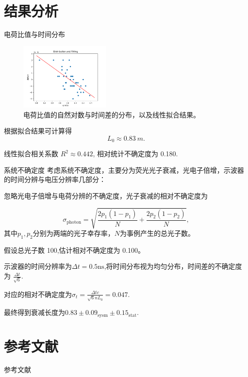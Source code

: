 \documentclass[10pt]{beamer}
\begin{document}
\section{结果分析}
\label{sec:orgc25006c}
\begin{frame}[label={sec:org93946de}]{电荷比值与时间分布}
\begin{figure}[htbp]
\centering
\includegraphics[width=0.4\textwidth]{../AttenuationLength/figs/dist.png}
\caption{电荷比值的自然对数与时间差的分布，以及线性拟合结果。}
\end{figure}

根据拟合结果可计算得
\begin{equation}
\label{eq:3}
L_0 \approx \qty{0.83}{m}.
\end{equation}

线性拟合相关系数 \(R^2 \approx 0.442\), 相对统计不确定度为 0.180.
\end{frame}

\begin{frame}{系统不确定度}
    考虑系统不确定度，主要分为荧光光子衰减，光电子倍增，示波器的时间分辨与电压分辨率几部分：

    忽略光电子倍增与电荷分辨的不确定度，光子衰减的相对不确定度为

    \begin{equation}
    \label{eq:4}
    \sigma_\mathrm{photon}=\sqrt{\frac{2p_1(1-p_1)}{N}+\frac{2p_2(1-p_2)}{N}},
    \end{equation}
    其中$p_1,p_2$分别为两端的光子幸存率，$N$为事例产生的总光子数。
    
    假设总光子数 100,估计相对不确定度为 0.100。

    示波器的时间分辨率为$\Delta t=0.5\mathrm{ns}$,将时间分布视为均匀分布，时间差的不确定度为 $\frac{\Delta t}{\sqrt{6}}$.

    对应的相对不确定度为$\sigma_t=\frac{\Delta tc}{\sqrt{6}nL_0}=0.047.$

    最终得到衰减长度为$0.83\pm0.09_{\mathrm{sysm}}\pm0.15_{\mathrm{stat}}.$
\end{frame}
\section{参考文献}
\label{sec:orgf6ca842}
\begin{frame}[allowframebreaks]{参考文献}
\end{frame}
\end{document}
